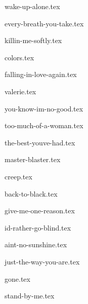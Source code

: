\begin{songs}{}

  {wake-up-alone.tex}
  \sclearpage

  {every-breath-you-take.tex}
  \sclearpage

  {killin-me-softly.tex}
  \sclearpage
  
  {colors.tex}
  \sclearpage
  
  {falling-in-love-again.tex}  
  \sclearpage

  {valerie.tex}
  \sclearpage
    
  {you-know-im-no-good.tex}
  \sclearpage

  {too-much-of-a-woman.tex}
  \sclearpage

  {the-best-youve-had.tex}
  \sclearpage

  {master-blaster.tex}
  \sclearpage  

  {creep.tex}
  \sclearpage
  
  {back-to-black.tex}
  \sclearpage
  
  {give-me-one-reason.tex}
  \sclearpage
  
  {id-rather-go-blind.tex}  
  \sclearpage

  {aint-no-sunshine.tex}
  \sclearpage
  
  {just-the-way-you-are.tex}
  \sclearpage  
  
  {gone.tex}
  \sclearpage

  {stand-by-me.tex}
  \sclearpage
  
  
  
      


  
  
  
  
\end{songs}
